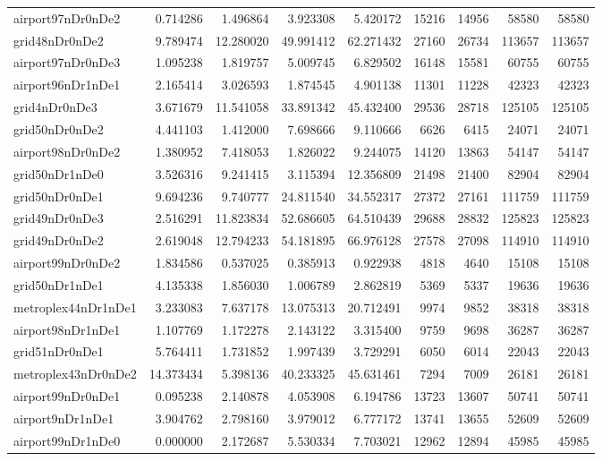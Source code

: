\begin{longtable}{|l|r|r|r|r|r|r|r|r|}
airport97nDr0nDe2 & 0.714286 & 1.496864 & 3.923308 & 5.420172 & 15216 & 14956 & 58580 & 58580 \\
grid48nDr0nDe2 & 9.789474 & 12.280020 & 49.991412 & 62.271432 & 27160 & 26734 & 113657 & 113657 \\
airport97nDr0nDe3 & 1.095238 & 1.819757 & 5.009745 & 6.829502 & 16148 & 15581 & 60755 & 60755 \\
airport96nDr1nDe1 & 2.165414 & 3.026593 & 1.874545 & 4.901138 & 11301 & 11228 & 42323 & 42323 \\
grid4nDr0nDe3 & 3.671679 & 11.541058 & 33.891342 & 45.432400 & 29536 & 28718 & 125105 & 125105 \\
grid50nDr0nDe2 & 4.441103 & 1.412000 & 7.698666 & 9.110666 & 6626 & 6415 & 24071 & 24071 \\
airport98nDr0nDe2 & 1.380952 & 7.418053 & 1.826022 & 9.244075 & 14120 & 13863 & 54147 & 54147 \\
grid50nDr1nDe0 & 3.526316 & 9.241415 & 3.115394 & 12.356809 & 21498 & 21400 & 82904 & 82904 \\
grid50nDr0nDe1 & 9.694236 & 9.740777 & 24.811540 & 34.552317 & 27372 & 27161 & 111759 & 111759 \\
grid49nDr0nDe3 & 2.516291 & 11.823834 & 52.686605 & 64.510439 & 29688 & 28832 & 125823 & 125823 \\
grid49nDr0nDe2 & 2.619048 & 12.794233 & 54.181895 & 66.976128 & 27578 & 27098 & 114910 & 114910 \\
airport99nDr0nDe2 & 1.834586 & 0.537025 & 0.385913 & 0.922938 & 4818 & 4640 & 15108 & 15108 \\
grid50nDr1nDe1 & 4.135338 & 1.856030 & 1.006789 & 2.862819 & 5369 & 5337 & 19636 & 19636 \\
metroplex44nDr1nDe1 & 3.233083 & 7.637178 & 13.075313 & 20.712491 & 9974 & 9852 & 38318 & 38318 \\
airport98nDr1nDe1 & 1.107769 & 1.172278 & 2.143122 & 3.315400 & 9759 & 9698 & 36287 & 36287 \\
grid51nDr0nDe1 & 5.764411 & 1.731852 & 1.997439 & 3.729291 & 6050 & 6014 & 22043 & 22043 \\
metroplex43nDr0nDe2 & 14.373434 & 5.398136 & 40.233325 & 45.631461 & 7294 & 7009 & 26181 & 26181 \\
airport99nDr0nDe1 & 0.095238 & 2.140878 & 4.053908 & 6.194786 & 13723 & 13607 & 50741 & 50741 \\
airport9nDr1nDe1 & 3.904762 & 2.798160 & 3.979012 & 6.777172 & 13741 & 13655 & 52609 & 52609 \\
airport99nDr1nDe0 & 0.000000 & 2.172687 & 5.530334 & 7.703021 & 12962 & 12894 & 45985 & 45985 \\

\end{longtable}
